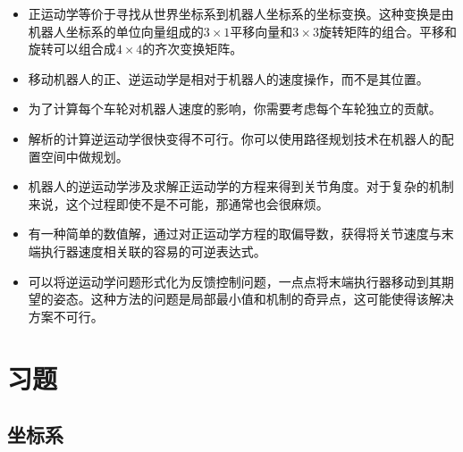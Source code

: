 \begin{itemize}
\item 正运动学等价于寻找从世界坐标系到机器人坐标系的坐标变换。这种变换是由机器人坐标系的单位向量组成的$3\times 1$平移向量和$3\times 3$旋转矩阵的组合。平移和旋转可以组合成$4\times 4$的齐次变换矩阵。
\item 移动机器人的正、逆运动学是相对于机器人的速度操作，而不是其位置。
\item 为了计算每个车轮对机器人速度的影响，你需要考虑每个车轮独立的贡献。
\item 解析的计算逆运动学很快变得不可行。你可以使用路径规划技术在机器人的配置空间中做规划。
\item 机器人的逆运动学涉及求解正运动学的方程来得到关节角度。对于复杂的机制来说，这个过程即使不是不可能，那通常也会很麻烦。
\item 有一种简单的数值解，通过对正运动学方程的取偏导数，获得将关节速度与末端执行器速度相关联的容易的可逆表达式。
\item 可以将逆运动学问题形式化为反馈控制问题，一点点将末端执行器移动到其期望的姿态。这种方法的问题是局部最小值和机制的奇异点，这可能使得该解决方案不可行。
\end{itemize}

\section*{习题}\small
\subsection*{坐标系}

